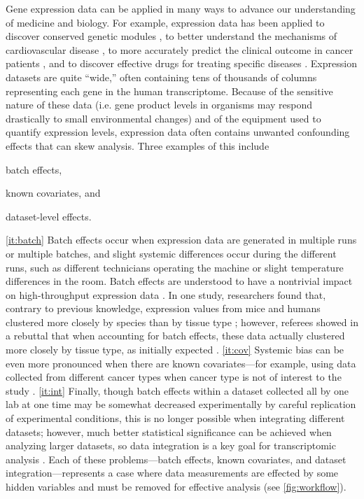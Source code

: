 \documentclass[11pt]{article}
\begin{document}
Gene expression data can be applied in many ways to advance our understanding of medicine and biology.
For example, expression data has been applied to discover conserved genetic modules \citep{stuart_gene-coexpression_2003}, to better understand the mechanisms of cardiovascular disease \citep{henriksen_application_2002}, to more accurately predict the clinical outcome in cancer patients \citep{veer_gene_2002}, and to discover effective drugs for treating specific diseases \citep{sirota_discovery_2011}.
Expression datasets are quite ``wide,'' often containing tens of thousands of columns representing each gene in the human transcriptome.
Because of the sensitive nature of these data (i.e. gene product levels in organisms may respond drastically to small environmental changes) and of the equipment used to quantify expression levels, expression data often contains unwanted confounding effects that can skew analysis.
Three examples of this include
\begin{enumerate*}[(a)]
	\item batch effects, \label{it:batch}
	\item known covariates, and \label{it:cov}
	\item dataset-level effects. \label{it:int}
\end{enumerate*}
\ref{it:batch} Batch effects occur when expression data are generated in multiple runs or multiple batches, and slight systemic differences occur during the different runs, such as different technicians operating the machine or slight temperature differences in the room.
Batch effects are understood to have a nontrivial impact on high-throughput expression data \citep{leek_tackling_2010}.
In one study, researchers found that, contrary to previous knowledge, expression values from mice and humans clustered more closely by species than by tissue type \citep{yue_comparative_2014};
however, referees showed in a rebuttal that when accounting for batch effects, these data actually clustered more closely by tissue type, as initially expected \citep{gilad_reanalysis_2015}.
\ref{it:cov} Systemic bias can be even more pronounced when there are known covariates---for example, using data collected from different cancer types when cancer type is not of interest to the study \citep{dayton_classifying_2017-1}.
\ref{it:int} Finally, though batch effects within a dataset collected all by one lab at one time may be somewhat decreased experimentally by careful replication of experimental conditions, this is no longer possible when integrating different datasets;
however, much better statistical significance can be achieved when analyzing larger datasets, so data integration is a key goal for transcriptomic analysis  \citep{lazar_batch_2013}.
Each of these problems---batch effects, known covariates, and dataset integration---represents a case where data measurements are effected by some hidden variables and must be removed for effective analysis (see \figurename{} \ref{fig:workflow}).
\end{document}
